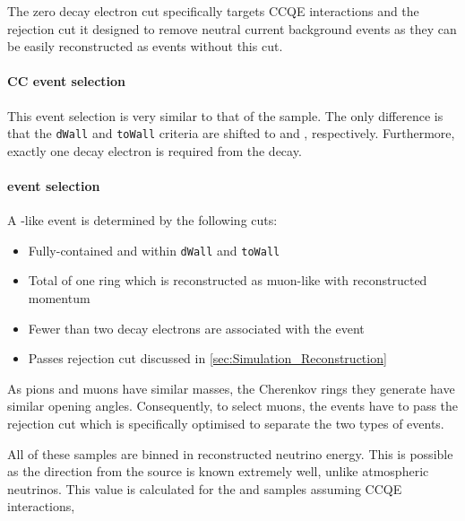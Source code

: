 The zero decay electron cut specifically targets CCQE interactions and the  rejection cut it designed to remove neutral current  background events as they can be easily reconstructed as  events without this cut.

\paragraph{CC\quickmath{1\pi^{+}} event selection} This event selection is very similar to that of the  sample. The only difference is that the \texttt{dWall} and \texttt{toWall} criteria are shifted to  and , respectively. Furthermore, exactly one decay electron is required from the \quickmath{\pi^{+}} decay. 

\paragraph{ event selection}

A -like event is determined by the following cuts:

\begin{itemize}
\item Fully-contained and within \texttt{dWall}  and \texttt{toWall} 
\item Total of one ring which is reconstructed as muon-like with reconstructed momentum 
\item Fewer than two decay electrons are associated with the event
\item Passes \quickmath{\pi^{+}} rejection cut discussed in \autoref{sec:Simulation_Reconstruction}
\end{itemize}

As pions and muons have similar masses, the Cherenkov rings they generate have similar opening angles. Consequently, to select muons, the events have to pass the \quickmath{\pi^{+}} rejection cut which is specifically optimised to separate the two types of events.

All of these samples are binned in reconstructed neutrino energy. This is possible as the direction from the source is known extremely well, unlike atmospheric neutrinos. This value is calculated for the  and  samples assuming CCQE interactions,

